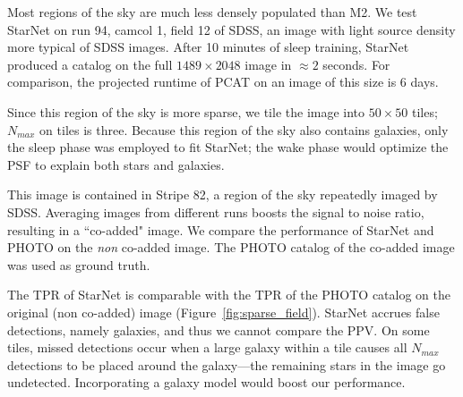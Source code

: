 Most regions of the sky are much less densely populated than M2.
We test StarNet on run 94, camcol 1, field 12 of SDSS,
an image with light source density more typical of SDSS images.
After 10 minutes of sleep training, StarNet produced a catalog on the full $1489\times 2048$ image in $\approx2$ seconds.
For comparison, the projected runtime of PCAT on an image of this size is 6 days.

Since this region of the sky is more sparse, we tile the image into $50\times 50$ tiles; $N_{max}$ on tiles is three.
Because this region of the sky also contains galaxies, only the sleep phase was employed to fit StarNet;
the wake phase would optimize the PSF to explain both stars and galaxies.

This image is contained in Stripe 82, a region of the sky repeatedly imaged by SDSS.
Averaging images from different runs boosts the signal to noise ratio, resulting in a ``co-added" image.
We compare the performance of StarNet and PHOTO on the {\itshape non} co-added image.
The PHOTO catalog of the co-added image was used as ground truth.

The TPR of StarNet is comparable with the TPR of the PHOTO catalog on the original (non co-added) image (Figure~\ref{fig:sparse_field}).
StarNet accrues false detections, namely galaxies, and thus we cannot compare the PPV.
On some tiles, missed detections occur when a large galaxy within a tile causes all $N_{max}$ detections to be placed around the galaxy---the remaining stars in the image go undetected.
Incorporating a galaxy model would boost our performance.


